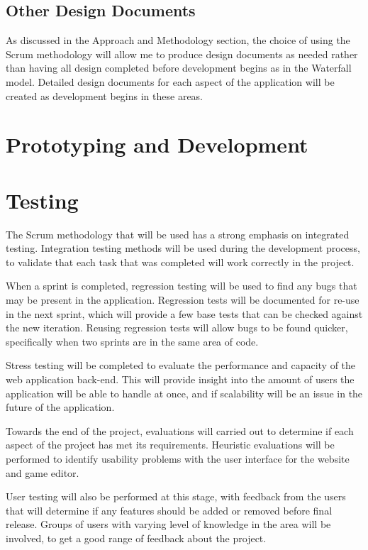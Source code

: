 \documentclass[a4paper, 12pt]{article}
\begin{document}
\subsection{Other Design Documents}
As discussed in the Approach and Methodology section, the choice of using the Scrum methodology will allow me to produce design documents as needed rather than having all design completed before development begins as in the Waterfall model. Detailed design documents for each aspect of the application will be created as development begins in these areas.

\section{Prototyping and Development}
\section{Testing}
The Scrum methodology that will be used has a strong emphasis on integrated testing. Integration testing methods will be used during the development process, to validate that each task that was completed will work correctly in the project.

When a sprint is completed, regression testing will be used to find any bugs that may be present in the application. Regression tests will be documented for re-use in the next sprint, which will provide a few base tests that can be checked against the new iteration. Reusing regression tests will allow bugs to be found quicker, specifically when two sprints are in the same area of code.


Stress testing will be completed to evaluate the performance and capacity of the web application back-end. This will provide insight into the amount of users the application will be able to handle at once, and if scalability will be an issue in the future of the application.

Towards the end of the project, evaluations will carried out to determine if each aspect of the project has met its requirements. Heuristic evaluations will be performed to identify usability problems with the user interface for the website and game editor.

User testing will also be performed at this stage, with feedback from the users that will determine if any features should be added or removed before final release. Groups of users with varying level of knowledge in the area will be involved, to get a good range of feedback about the project.
\end{document}
